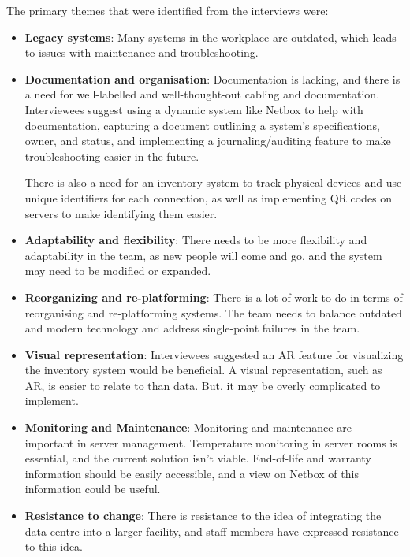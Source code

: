 \documentclass [11pt,a4paper]{article}
\begin{document}
The primary themes that were identified from the interviews were:

\begin{itemize}[topsep=0pt]
    \item \textbf{Legacy systems}: Many systems in the workplace are outdated, which leads to issues with maintenance and troubleshooting.

    \item \textbf{Documentation and organisation}: Documentation is lacking, and there is a need for well-labelled and well-thought-out cabling and documentation. Interviewees suggest using a dynamic system like Netbox to help with documentation, capturing a document outlining a system's specifications, owner, and status, and implementing a journaling/auditing feature to make troubleshooting easier in the future. 
    
    \pagebreak
    
    There is also a need for an inventory system to track physical devices and use unique identifiers for each connection, as well as implementing QR codes on servers to make identifying them easier.

    \item \textbf{Adaptability and flexibility}: There needs to be more flexibility and adaptability in the team, as new people will come and go, and the system may need to be modified or expanded.

    \item \textbf{Reorganizing and re-platforming}: There is a lot of work to do in terms of reorganising and re-platforming systems. The team needs to balance outdated and modern technology and address single-point failures in the team.

    \item \textbf{Visual representation}: Interviewees suggested an AR feature for visualizing the inventory system would be beneficial. A visual representation, such as AR, is easier to relate to than data. But, it may be overly complicated to implement.

    \item \textbf{Monitoring and Maintenance}: Monitoring and maintenance are important in server management. Temperature monitoring in server rooms is essential, and the current solution isn't viable. End-of-life and warranty information should be easily accessible, and a view on Netbox of this information could be useful.

    \item \textbf{Resistance to change}: There is resistance to the idea of integrating the data centre into a larger facility, and staff members have expressed resistance to this idea.

\end{itemize}
\end{document}
